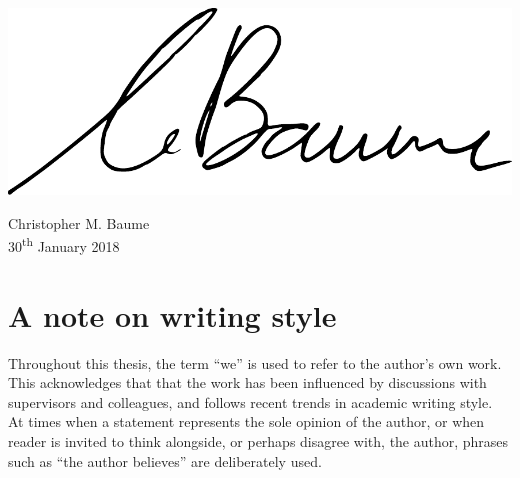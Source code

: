 \documentclass[11pt,a4paper,twoside,openany]{book}
\begin{document}
\vspace{1cm}
\hfill
\includegraphics[width=.3\textwidth]{figs/signature.pdf}
\begin{flushright}
Christopher M. Baume\\
30\textsuperscript{th} January 2018
\end{flushright}





\chapter*{A note on writing style}
Throughout this thesis, the term ``we'' is used to refer to the author's own work. This acknowledges that that the work
has been influenced by discussions with supervisors and colleagues, and follows recent trends in academic writing
style.  At times when a statement represents the sole opinion of the author, or when reader is invited to think
alongside, or perhaps disagree with, the author, phrases such as ``the author believes'' are deliberately used.


\tableofcontents

\listoffigures

\listoftables





\pagestyle{fancy}
\mainmatter

\cleardoublepage


\cleardoublepage


\cleardoublepage

\end{document}
